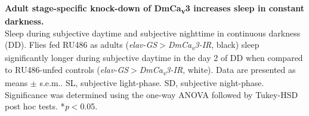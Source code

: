 \label{fig:S4}
\textbf{Adult stage-specific knock-down of DmCa\textsubscript{v}3 increases sleep in constant darkness.}
\\
Sleep during subjective daytime and subjective nighttime in continuous darkness (DD). 
Flies fed RU486 as adults (\emph{elav-GS$>$DmCa\textsubscript{v}3-IR}, black) sleep significantly longer during subjective daytime in the day 2 of DD when compared to RU486-unfed controls (\emph{elav-GS$>$DmCa\textsubscript{v}3-IR}, white).
Data are presented as means $\pm$ s.e.m..
SL, subjective light-phase.
SD, subjective night-phase.
Significance was determined using the one-way ANOVA followed by Tukey-HSD post hoc tests.
*\emph{p}$<$0.05.

  